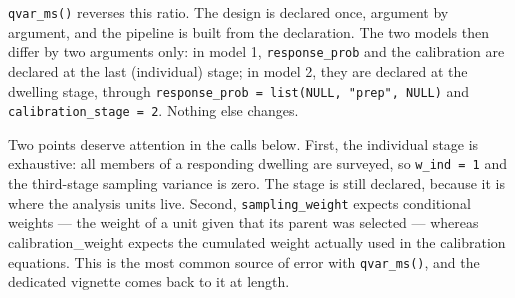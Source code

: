 \documentclass[
]{article}
\begin{document}
\texttt{qvar\_ms()} reverses this ratio. The design is declared once,
argument by argument, and the pipeline is built from the declaration.
The two models then differ by two arguments only: in model 1,
\texttt{response\_prob} and the calibration are declared at the last
(individual) stage; in model 2, they are declared at the dwelling stage,
through \texttt{response\_prob\ =\ list(NULL,\ "prep",\ NULL)} and
\texttt{calibration\_stage\ =\ 2}. Nothing else changes.

Two points deserve attention in the calls below. First, the individual
stage is exhaustive: all members of a responding dwelling are surveyed,
so \texttt{w\_ind\ =\ 1} and the third-stage sampling variance is zero.
The stage is still declared, because it is where the analysis units
live. Second, \texttt{sampling\_weight} expects conditional weights ---
the weight of a unit given that its parent was selected --- whereas
calibration\_weight expects the cumulated weight actually used in the
calibration equations. This is the most common source of error with
\texttt{qvar\_ms()}, and the dedicated vignette comes back to it at
length.
\end{document}
